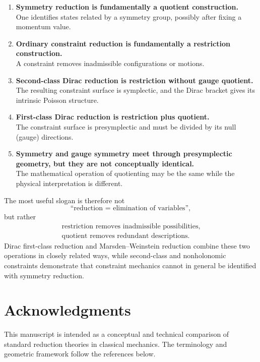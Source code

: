 \documentclass[11pt,a4paper]{article}
\theoremstyle{definition}
\begin{document}
\begin{enumerate}
\item \textbf{Symmetry reduction is fundamentally a quotient construction.}\\
One identifies states related by a symmetry group, possibly after fixing a
momentum value.

\item \textbf{Ordinary constraint reduction is fundamentally a restriction
construction.}\\
A constraint removes inadmissible configurations or motions.

\item \textbf{Second-class Dirac reduction is restriction without gauge
quotient.}\\
The resulting constraint surface is symplectic, and the Dirac bracket gives
its intrinsic Poisson structure.

\item \textbf{First-class Dirac reduction is restriction plus quotient.}\\
The constraint surface is presymplectic and must be divided by its null
(gauge) directions.

\item \textbf{Symmetry and gauge symmetry meet through presymplectic
geometry, but they are not conceptually identical.}\\
The mathematical operation of quotienting may be the same while the physical
interpretation is different.
\end{enumerate}

The most useful slogan is therefore not
\[
        \text{``reduction = elimination of variables''},
\]
but rather
\[
\boxed{
\begin{array}{c}
\text{restriction removes inadmissible possibilities},\\[2mm]
\text{quotient removes redundant descriptions}.
\end{array}}
\]
Dirac first-class reduction and Marsden--Weinstein reduction combine these
two operations in closely related ways, while second-class and nonholonomic
constraints demonstrate that constraint mechanics cannot in general be
identified with symmetry reduction.

\section*{Acknowledgments}
This manuscript is intended as a conceptual and technical comparison of
standard reduction theories in classical mechanics.  The terminology and
geometric framework follow the references below.
\end{document}
